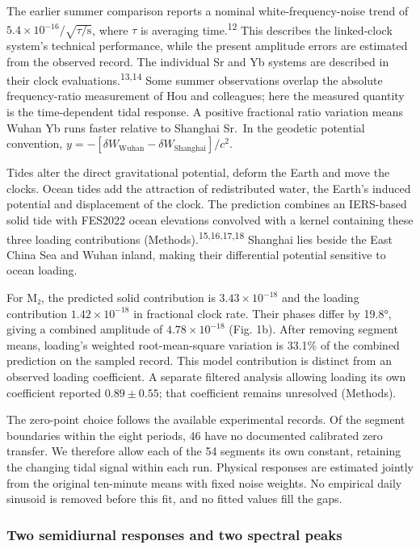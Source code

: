 \documentclass[
  10pt,
  a4paper,
]{article}
\begin{document}
The earlier summer comparison reports a nominal white-frequency-noise
trend of \(5.4\times10^{-16}/\sqrt{\tau/\mathrm{s}}\), where \(\tau\) is
averaging time.\textsuperscript{12} This describes the linked-clock
system's technical performance, while the present amplitude errors are
estimated from the observed record. The individual Sr and Yb systems are
described in their clock evaluations.\textsuperscript{13,14} Some summer
observations overlap the absolute frequency-ratio measurement of Hou and
colleagues; here the measured quantity is the time-dependent tidal
response. A positive fractional ratio variation means Wuhan Yb runs
faster relative to Shanghai Sr.~In the geodetic potential convention,
\(y=-[\delta W_{\mathrm{Wuhan}}-\delta W_{\mathrm{Shanghai}}]/c^2\).

Tides alter the direct gravitational potential, deform the Earth and
move the clocks. Ocean tides add the attraction of redistributed water,
the Earth's induced potential and displacement of the clock. The
prediction combines an IERS-based solid tide with FES2022 ocean
elevations convolved with a kernel containing these three loading
contributions (Methods).\textsuperscript{15,16,17,18} Shanghai lies
beside the East China Sea and Wuhan inland, making their differential
potential sensitive to ocean loading.

For M₂, the predicted solid contribution is \(3.43\times10^{-18}\) and
the loading contribution \(1.42\times10^{-18}\) in fractional clock
rate. Their phases differ by 19.8°, giving a combined amplitude of
\(4.78\times10^{-18}\) (Fig. 1b). After removing segment means,
loading's weighted root-mean-square variation is 33.1\% of the combined
prediction on the sampled record. This model contribution is distinct
from an observed loading coefficient. A separate filtered analysis
allowing loading its own coefficient reported \(0.89\pm0.55\); that
coefficient remains unresolved (Methods).

The zero-point choice follows the available experimental records. Of the
segment boundaries within the eight periods, 46 have no documented
calibrated zero transfer. We therefore allow each of the 54 segments its
own constant, retaining the changing tidal signal within each run.
Physical responses are estimated jointly from the original ten-minute
means with fixed noise weights. No empirical daily sinusoid is removed
before this fit, and no fitted values fill the gaps.

\hypertarget{two-semidiurnal-responses-and-two-spectral-peaks}{%
\subsubsection{Two semidiurnal responses and two spectral
peaks}\label{two-semidiurnal-responses-and-two-spectral-peaks}}
\end{document}
